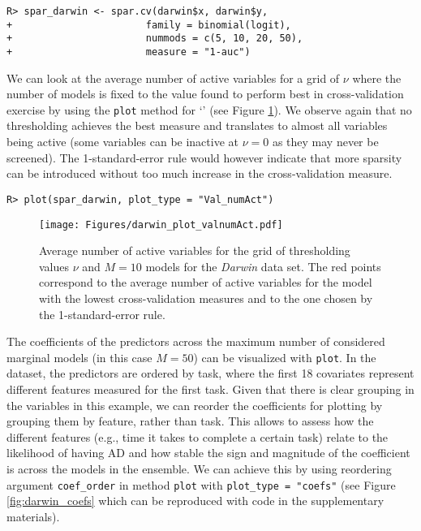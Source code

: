 \documentclass[
  article]{jss}
\newcommand{\class}[1]{`\code{#1}'}
\begin{document}
\begin{verbatim}
R> spar_darwin <- spar.cv(darwin$x, darwin$y,
+                       family = binomial(logit),
+                       nummods = c(5, 10, 20, 50),
+                       measure = "1-auc")
\end{verbatim}

We can look at the average number of active variables for a grid of
\(\nu\) where the number of models is fixed to the value found to
perform best in cross-validation exercise by using the \texttt{plot}
method for \class{spar.cv} (see Figure \ref{fig:darwin_activevars}). We
observe again that no thresholding achieves the best measure and
translates to almost all variables being active (some variables can be
inactive at \(\nu=0\) as they may never be screened). The
1-standard-error rule would however indicate that more sparsity can be
introduced without too much increase in the cross-validation measure.

\begin{verbatim}
R> plot(spar_darwin, plot_type = "Val_numAct")
\end{verbatim}

\begin{figure}[t!]
\centering
\texttt{[image: Figures/darwin\_plot\_valnumAct.pdf]}
\caption{Average number of active variables for the grid of thresholding values 
$\nu$ and $M=10$ models for the \emph{Darwin} data set. The red points correspond to the average number of active variables for the model with the lowest cross-validation measures and to the one chosen by the 1-standard-error rule. \label{fig:darwin_activevars}}
\end{figure}

The coefficients of the predictors across the maximum number of
considered marginal models (in this case \(M=50\)) can be visualized
with \texttt{plot}. In the dataset, the predictors are ordered by task,
where the first 18 covariates represent different features measured for
the first task. Given that there is clear grouping in the variables in
this example, we can reorder the coefficients for plotting by grouping
them by feature, rather than task. This allows to assess how the
different features (e.g., time it takes to complete a certain task)
relate to the likelihood of having AD and how stable the sign and
magnitude of the coefficient is across the models in the ensemble. We
can achieve this by using reordering argument \texttt{coef\_order} in
method \texttt{plot} with \texttt{plot\_type\ =\ "coefs"} (see Figure
\ref{fig:darwin_coefs} which can be reproduced with code in the
supplementary materials).
\end{document}
